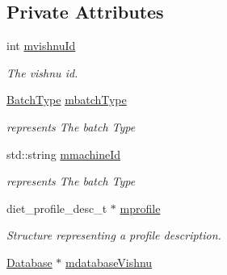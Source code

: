 \subsection*{Private Attributes}
\begin{DoxyCompactItemize}
\item 
\hypertarget{classServerTMS_abb3f2b7bff3f06d0ed84625078c192bd}{
int \hyperlink{classServerTMS_abb3f2b7bff3f06d0ed84625078c192bd}{mvishnuId}}
\label{classServerTMS_abb3f2b7bff3f06d0ed84625078c192bd}

\begin{DoxyCompactList}\small\item\em The vishnu id. \item\end{DoxyCompactList}\item 
\hypertarget{classServerTMS_a5f01c1c5ba6cb5418603f94023206c4c}{
\hyperlink{utilVishnu_8hpp_a864d748e7097d176552dd4c7635016ea}{BatchType} \hyperlink{classServerTMS_a5f01c1c5ba6cb5418603f94023206c4c}{mbatchType}}
\label{classServerTMS_a5f01c1c5ba6cb5418603f94023206c4c}

\begin{DoxyCompactList}\small\item\em represents The batch Type \item\end{DoxyCompactList}\item 
\hypertarget{classServerTMS_a86d444314b5589f2a05bcdfae54e0fd5}{
std::string \hyperlink{classServerTMS_a86d444314b5589f2a05bcdfae54e0fd5}{mmachineId}}
\label{classServerTMS_a86d444314b5589f2a05bcdfae54e0fd5}

\begin{DoxyCompactList}\small\item\em represents The batch Type \item\end{DoxyCompactList}\item 
\hypertarget{classServerTMS_a52bf0e30383296a82ebdafc3f65510d8}{
diet\_\-profile\_\-desc\_\-t $\ast$ \hyperlink{classServerTMS_a52bf0e30383296a82ebdafc3f65510d8}{mprofile}}
\label{classServerTMS_a52bf0e30383296a82ebdafc3f65510d8}

\begin{DoxyCompactList}\small\item\em Structure representing a profile description. \item\end{DoxyCompactList}\item 
\hypertarget{classServerTMS_a643c38a0009de44a16a7beaf06eaeb86}{
\hyperlink{classDatabase}{Database} $\ast$ \hyperlink{classServerTMS_a643c38a0009de44a16a7beaf06eaeb86}{mdatabaseVishnu}}
\label{classServerTMS_a643c38a0009de44a16a7beaf06eaeb86}


\end{DoxyCompactItemize}
